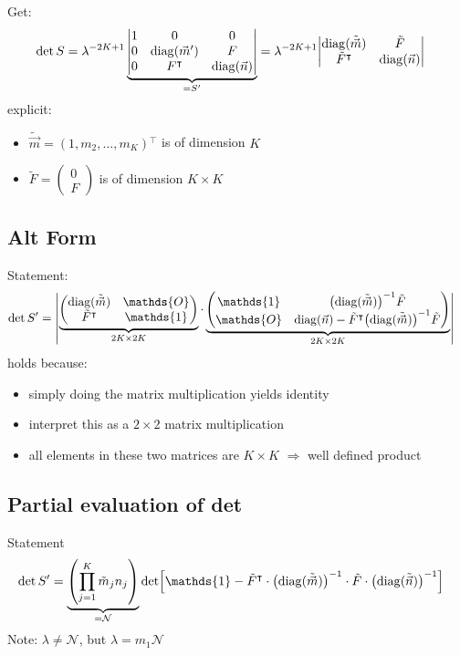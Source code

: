 \documentclass[
	english,
	a4paper,
	fontsize=10pt,
	parskip=half,
	titlepage=true,
	DIV=12,
	final
]{scrreprt}
\newcommand*{\Thus}{\ensuremath{\Rightarrow}\xspace}
\newcommand*{\transp}{\ensuremath{^\intercal}}
\DeclareMathOperator{\diag}{diag}
\begin{document}
Get:
\begin{align}
	\det S
&=
	\lambda^{-2K+1}
	\underbrace{\mqty|
		1	& 0					& 0			\\
		0	& \diag(\vec{m}')	& F			\\
		0	& F\transp			& \diag(\vec{n})
	|}_{= S'}
=
	\lambda^{-2K+1}
	\mqty|
		\diag(\tilde{\vec{m}})	& \tilde{F}			\\
		\tilde{F}\transp			& \diag(\vec{n})
	|
\end{align}
explicit:
\begin{itemize}
\item $\tilde{\vec{m}} = (1, m_2, \ldots, m_K)\transp$ is of dimension $K$
\item $\tilde{F} = \begin{pmatrix}
		0 \\ F
	\end{pmatrix}$
	is of dimension $K \times K$
\end{itemize}

\subsection{Alt Form}
Statement:
\begin{align}
	\det S'
&=
	\mqty|
		\underbrace{\begin{pmatrix}
			\diag(\tilde{\vec{m}})	& \mathds{O}			\\
			\tilde{F}\transp			& \mathds{1}
		\end{pmatrix}}_{2K \times 2K}
		\cdot
		\underbrace{\begin{pmatrix}
			\mathds{1}	&	\qty(\diag(\tilde{\vec{m}}))^{-1} \tilde{F}		\\
			\mathds{O}	&	\diag(\vec{n}) - \tilde{F}\transp \qty(\diag(\tilde{\vec{m}}))^{-1}\tilde{F}
		\end{pmatrix}}_{2K \times 2K}
	|
	\label{eqn:detProto}
\end{align}
holds because:
\begin{itemize}
\item simply doing the matrix multiplication yields identity
\item interpret this as a $2 \times 2$ matrix multiplication
\item all elements in these two matrices are $K \times K$ \Thus well defined product
\end{itemize}

\subsection{Partial evaluation of det}
Statement
\begin{align}
	\det S'
&=
	\underbrace{
		\qty( \prod_{j=1}^{K} \tilde{m}_j n_j )
	}_{= \mathcal{N} }
	\det[
		\mathds{1} -
		\tilde{F}\transp \cdot \qty( \diag(\tilde{\vec{m}}) )^{-1}
		\cdot
		\tilde{F} \cdot \qty( \diag(\tilde{\vec{n}}) )^{-1}
	]
\label{eqn:detSPrimePartial}
\end{align}
Note: $\lambda \neq \mathcal{N}$, but $\lambda = m_1 \mathcal{N}$
\end{document}
